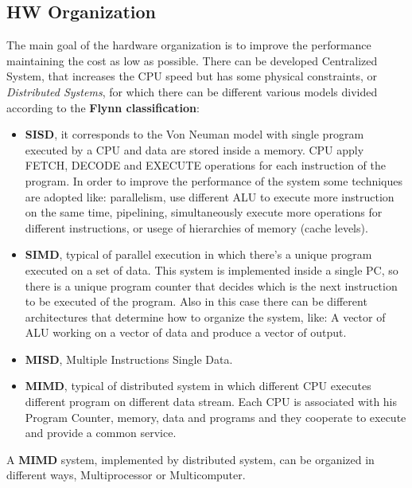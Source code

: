\documentclass[11pt,a4paper]{article}
\begin{document}
\subsection{HW Organization}
The main goal of the hardware organization is to improve the performance maintaining the cost as low as possible. There can be developed Centralized System, that increases the CPU speed but has some physical constraints, or \textit{Distributed Systems}, for which there can be different various models divided according to the \textbf{Flynn classification}:
\begin{itemize}
    \item \textbf{SISD}, it corresponds to the Von Neuman model with single program executed by a CPU and data are stored inside a memory. CPU apply FETCH, DECODE and EXECUTE operations for each instruction of the program. In order to improve the performance of the system some techniques are adopted like: parallelism, use different ALU to execute more instruction on the same time, pipelining, simultaneously execute more operations for different instructions, or usege of hierarchies of memory (cache levels).
    \item \textbf{SIMD}, typical of parallel execution in which there's a unique program executed on a set of data. This system is implemented inside a single PC, so there is a unique program counter that decides which is the next instruction to be executed of the program. Also in this case there can be different architectures that determine how to organize the system, like: A vector of ALU working on a vector of data and produce a vector of output.
    \item \textbf{MISD}, Multiple Instructions Single Data.
    \item \textbf{MIMD}, typical of distributed system in which different CPU executes different program on different data stream. Each CPU is associated with his Program Counter, memory, data and programs and they cooperate to execute and provide a common service.
\end{itemize}

A \textbf{MIMD} system, implemented by distributed system, can be organized in different ways, Multiprocessor or Multicomputer.
\end{document}
